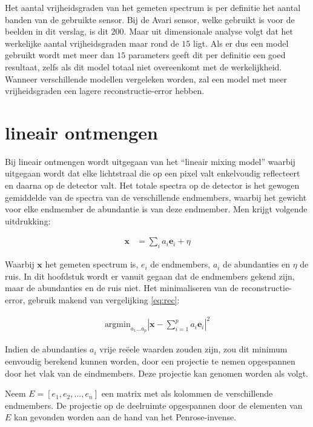 \documentclass[12pt]{report}
\begin{document}
Het aantal vrijheidsgraden van het gemeten spectrum is per definitie het aantal banden van de gebruikte sensor. Bij de Avari sensor, welke gebruikt is voor de beelden in dit verslag, is dit $200$. Maar uit dimensionale analyse volgt dat het werkelijke aantal vrijheidsgraden maar rond de $15$ ligt. Als er dus een model gebruikt wordt met meer dan $15$ parameters geeft dit per definitie een goed resultaat, zelfs als dit model totaal niet overeenkomt met de werkelijkheid. Wanneer verschillende modellen vergeleken worden, zal een model met meer vrijheidsgraden een lagere reconstructie-error hebben.  

\section{lineair ontmengen}

Bij lineair ontmengen wordt uitgegaan van het ``lineair mixing model'' waarbij uitgegaan wordt dat elke lichtstraal die op een pixel valt enkelvoudig reflecteert en daarna op de detector valt. Het totale spectra op de detector is het gewogen gemiddelde van de spectra van de verschillende endmembers, waarbij het gewicht voor elke endmember de abundantie is van deze endmember. Men krijgt volgende uitdrukking: 

\begin{align}
\bm{x} &= \sum_i a_i \bm{e}_i + \eta
\end{align}

Waarbij $\bm{x}$ het gemeten spectrum is, $e_i$ de endmembers, $a_i$ de abundanties en $\eta$ de ruis. In dit hoofdstuk wordt er vanuit gegaan dat de endmembers gekend zijn, maar de abundanties en de ruis niet. Het minimaliseren van de reconstructie-error, gebruik makend van vergelijking \ref{eq:rec}:

\begin{align}
\text{argmin}_{a_1 ... a_p} \left| \bm{x} - \sum_{i=1}^p a_i \bm{e}_i\right|^2
\end{align}

Indien de abundanties $a_i$ vrije re\"eele waarden zouden zijn, zou dit minimum eenvoudig berekend kunnen worden, door een projectie te nemen opgespannen door het vlak van de eindmembers. Deze projectie kan genomen worden als volgt.

Neem $E = [e_1,e_2,...,e_n]$ een matrix met als kolommen de verschillende endmembers. De projectie op de deelruimte opgespannen door de elementen van $E$ kan gevonden worden aan de hand van het Penrose-invense.
\end{document}
